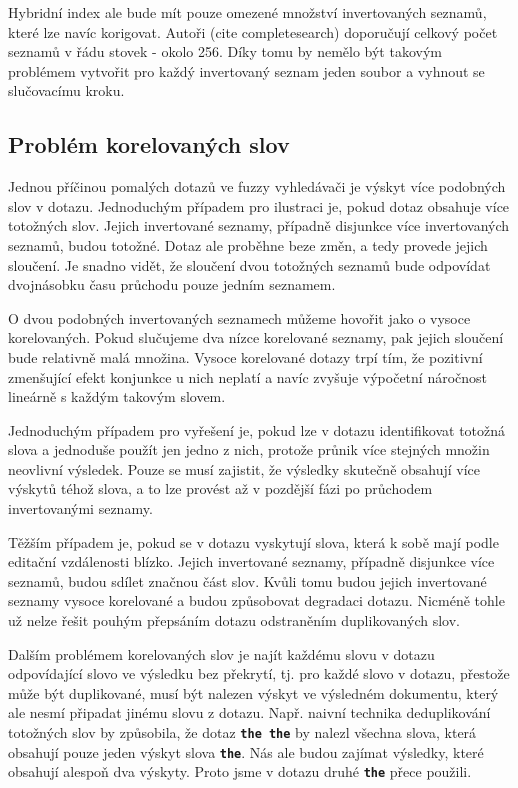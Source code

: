 \documentclass[12pt,letterpaper,oneside,openright]{book}
\newcommand{\bftt}[1]{\texttt{\textbf{#1}}}
\begin{document}

Hybridní index ale bude mít pouze omezené množství invertovaných seznamů, které
lze navíc korigovat. Autoři (cite completesearch) doporučují celkový počet
seznamů v řádu stovek - okolo 256. Díky tomu by nemělo být takovým problémem
vytvořit pro každý invertovaný seznam jeden soubor a vyhnout se slučovacímu
kroku.

\subsection{Problém korelovaných slov}
Jednou příčinou pomalých dotazů ve fuzzy vyhledávači je výskyt více podobných
slov v dotazu. Jednoduchým případem pro ilustraci je, pokud dotaz obsahuje více
totožných slov. Jejich invertované seznamy, případně disjunkce více
invertovaných seznamů, budou totožné. Dotaz ale proběhne beze změn, a tedy
provede jejich sloučení. Je snadno vidět, že sloučení dvou totožných seznamů
bude odpovídat dvojnásobku času průchodu pouze jedním seznamem.

O dvou podobných invertovaných seznamech můžeme hovořit jako o vysoce
korelovaných. Pokud slučujeme dva nízce korelované seznamy, pak jejich sloučení
bude relativně malá množina. Vysoce korelované dotazy trpí tím, že pozitivní
zmenšující efekt konjunkce u nich neplatí a navíc zvyšuje výpočetní náročnost
lineárně s každým takovým slovem.

Jednoduchým případem pro vyřešení je, pokud lze v dotazu identifikovat totožná
slova a jednoduše použít jen jedno z nich, protože průnik více stejných množin
neovlivní výsledek. Pouze se musí zajistit, že výsledky skutečně obsahují více
výskytů téhož slova, a to lze provést až v pozdější fázi po průchodem
invertovanými seznamy.

Těžším případem je, pokud se v dotazu vyskytují slova, která k sobě mají podle
editační vzdálenosti blízko. Jejich invertované seznamy, případně disjunkce
více seznamů, budou sdílet značnou část slov. Kvůli tomu budou jejich
invertované seznamy vysoce korelované a budou způsobovat degradaci dotazu.
Nicméně tohle už nelze řešit pouhým přepsáním dotazu odstraněním duplikovaných
slov.

Dalším problémem korelovaných slov je najít každému slovu v dotazu odpovídající
slovo ve výsledku bez překrytí, tj. pro každé slovo v dotazu, přestože může být
duplikované, musí být nalezen výskyt ve výsledném dokumentu, který ale nesmí
připadat jinému slovu z dotazu. Např. naivní technika deduplikování totožných
slov by způsobila, že dotaz \bftt{the the} by nalezl všechna slova, která
obsahují pouze jeden výskyt slova \bftt{the}. Nás ale budou zajímat výsledky,
které obsahují alespoň dva výskyty. Proto jsme v dotazu druhé \bftt{the} přece
použili.
\end{document}
